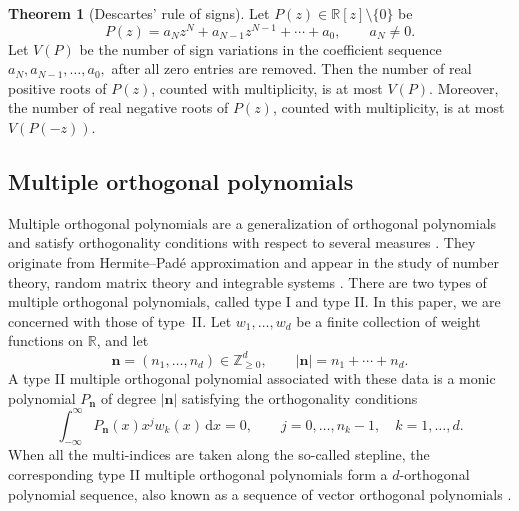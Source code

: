 \documentclass[preprint,3p,10pt]{elsarticle}
\theoremstyle{definition}
\newtheorem{theorem}{Theorem}[section]
\begin{document}
\begin{theorem}[Descartes' rule of signs]
\label{thm:descartes-rule-of-signs}
Let $P(z)\in\mathbb R[z]\setminus\{0\}$ be 
\begin{equation}
    P(z)=a_Nz^N+a_{N-1}z^{N-1}+\cdots+a_0, \qquad a_N\neq0.
\end{equation}
Let \(V(P)\) be the number of sign variations in the coefficient sequence $a_N,a_{N-1},\ldots,a_0,$ after all zero entries are removed. Then the number of real positive roots of
\(P(z)\), counted with multiplicity, is at most \(V(P)\). Moreover, the number of real negative roots of \(P(z)\), counted with multiplicity, is at most
\(V(P(-z))\).
\end{theorem}



\subsection{Multiple orthogonal polynomials}

Multiple orthogonal polynomials are a generalization of orthogonal polynomials and satisfy orthogonality conditions with respect to several measures
\cite{kuijlaars2010multiple,aptekarev1998multiple,VanAsscheCoussement2001}. They originate from Hermite--Pad\'e
approximation and appear in the study of number theory, random matrix theory and integrable systems \cite{bleher2011random,aptekarev1998multiple,kuijlaars2010multiple}.
There are two types of multiple orthogonal polynomials, called type I
and type II. In this paper, we are concerned with those of type~II. Let \(w_1,\ldots,w_d\) be a finite collection of weight
functions on \(\mathbb R\), and let
\[
    \mathbf n=(n_1,\ldots,n_d)\in\mathbb Z_{\geq 0}^d,
    \qquad
    |\mathbf n|=n_1+\cdots+n_d.
\]
A type II multiple orthogonal polynomial associated with these data is a monic polynomial \(P_{\mathbf n}\) of
degree \(|\mathbf n|\) satisfying the orthogonality conditions
\begin{equation}\label{eq:type-II-MOP}
    \int_{-\infty}^{\infty}
    P_{\mathbf n}(x)x^j w_k(x)\,\mathrm{d}x=0,
    \qquad
    j=0,\ldots,n_k-1,\quad k=1,\ldots,d.
\end{equation}
When all the multi-indices are taken along the so-called stepline, the
corresponding type II multiple orthogonal polynomials form a
\(d\)-orthogonal polynomial sequence, also known as a sequence of vector
orthogonal polynomials
\cite{VanIseghem1987,filipuk2015computing,sokal2024multiple}.
\end{document}
